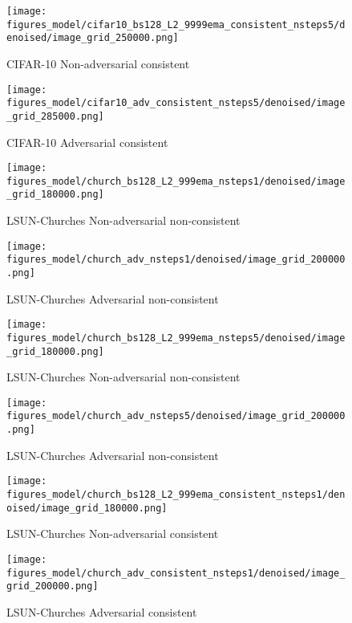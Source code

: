 \documentclass{article} \usepackage{iclr2021_conference_notitle,times}
\theoremstyle{definition}
\theoremstyle{definition}
\begin{document}
\begin{figure}[ht] 
    \centering
    \texttt{[image: figures\_model/cifar10\_bs128\_L2\_9999ema\_consistent\_nsteps5/denoised/image\_grid\_250000.png]}
    \caption{CIFAR-10 Non-adversarial consistent } 
\end{figure}
\begin{figure}[ht] 
    \centering
    \texttt{[image: figures\_model/cifar10\_adv\_consistent\_nsteps5/denoised/image\_grid\_285000.png]}
    \caption{CIFAR-10 Adversarial consistent } 
\end{figure}



\begin{figure}[ht] 
    \centering
    \texttt{[image: figures\_model/church\_bs128\_L2\_999ema\_nsteps1/denoised/image\_grid\_180000.png]}
    \caption{LSUN-Churches Non-adversarial non-consistent } 
\end{figure}
\begin{figure}[ht] 
    \centering
    \texttt{[image: figures\_model/church\_adv\_nsteps1/denoised/image\_grid\_200000.png]}
    \caption{LSUN-Churches Adversarial non-consistent } 
\end{figure}

\begin{figure}[ht] 
    \centering
    \texttt{[image: figures\_model/church\_bs128\_L2\_999ema\_nsteps5/denoised/image\_grid\_180000.png]}
    \caption{LSUN-Churches Non-adversarial non-consistent } 
\end{figure}
\begin{figure}[ht] 
    \centering
    \texttt{[image: figures\_model/church\_adv\_nsteps5/denoised/image\_grid\_200000.png]}
    \caption{LSUN-Churches Adversarial non-consistent } 
\end{figure}

\begin{figure}[ht] 
    \centering
    \texttt{[image: figures\_model/church\_bs128\_L2\_999ema\_consistent\_nsteps1/denoised/image\_grid\_180000.png]}
    \caption{LSUN-Churches Non-adversarial consistent } 
\end{figure}
\begin{figure}[ht] 
    \centering
    \texttt{[image: figures\_model/church\_adv\_consistent\_nsteps1/denoised/image\_grid\_200000.png]}
    \caption{LSUN-Churches Adversarial consistent } 
\end{figure}
\end{document}
